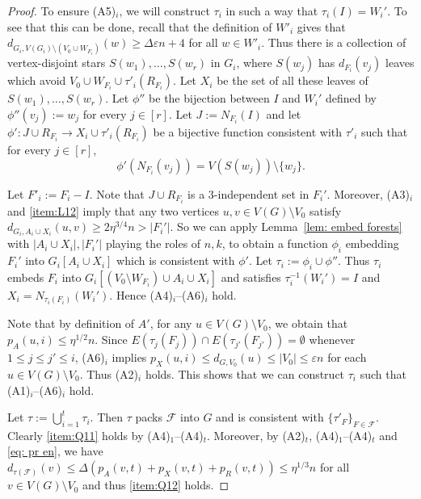 \documentclass[a4paper, 11pt, reqno]{amsart}
\numberwithin{equation}{section}
\newcommand{\1}{{\rm 1\hspace*{-0.4ex}%
\rule{0.1ex}{1.52ex}\hspace*{0.2ex}}}
\newcommand{\cF}{\mathcal{F}}
\renewcommand{\epsilon}{\varepsilon}
\newcommand{\sm}{\setminus}
\begin{document}
\begin{proof}
To ensure (A5)$_i$, we will construct $\tau_i$ in such a way that $\tau_i(I)=W_i'$.
To see that this can be done, recall that the definition of $W'_i$ gives that $d_{G_i,V(G_i)\setminus(V_0\cup W_{F_i})}(w)\geq \Delta \epsilon n+4$ for all $w\in W'_i$. 
Thus there is a collection of vertex-disjoint stars $S(w_1),\ldots,S(w_r)$ in $G_i$, 
where $S(w_j)$ has $d_{F_i}(v_j)$ leaves which avoid $V_0 \cup W_{F_i}\cup \tau'_{i}(R_{F_i})$.
Let $X_i$ be the set of all these leaves of $S(w_1),\ldots,S(w_r)$. 
Let $\phi''$ be the bijection between $I$ and $W_i'$ defined by $\phi''(v_j):=w_j$ for every $j\in [r]$. 
Let $J := N_{F_i}(I)$ and let $\phi': J\cup R_{F_i} \to X_i \cup \tau'_{i}(R_{F_i})$ be a bijective function consistent with $\tau'_{i}$ such that for every $j\in[r]$,
$$\phi'(N_{F_i}(v_j)) = V(S(w_j))\setminus \{w_j\}.$$ 

Let $F'_i:= F_i- I$. 
Note that $J\cup R_{F_i}$ is a $3$-independent set in $F_i'$. %
Moreover, (A3)$_i$ and \ref{item:L12} imply that any two vertices $u,v \in V(G)\sm V_0$ satisfy 
$d_{G_i,A_i\cup X_i}(u,v) \geq 2\eta^{3/4}n > |F_i'|$. 
So we can apply Lemma~\ref{lem: embed forests} with $|A_i\cup X_i|, |F_i'|$ playing the roles of $n, k$,
to obtain a function $\phi_i$ embedding $F_i'$ into $G_i[A_i\cup X_i]$ which is consistent with $\phi'$. 
Let $\tau_{i}:= \phi_i\cup \phi''$.
Thus $\tau_{i}$ embeds $F_i$ into $G_i[(V_0 \sm W_{F_i}) \cup A_i \cup X_i ]$ and satisfies $\tau_i^{-1}(W_i')=I$ and $X_i=N_{\tau_i(F_i)}(W_i')$. 
Hence (A4)$_i$--(A6)$_i$ hold.

Note that by definition of $A'$, for any $u\in V(G)\setminus V_0$, 
we obtain that $p_{A}(u,i)\leq%
\eta^{1/2} n$. 
Since $E(\tau_{j}(F_j))\cap E(\tau_{j'}(F_{j'})) = \emptyset$ whenever $1\leq j \leq j'\leq i$, 
(A6)$_i$ implies
$p_X(u,i)\leq d_{G,V_0}(u)\leq |V_0|\leq \epsilon n$ for each $u\in V(G)\sm V_0$. Thus (A2)$_i$ holds.
This shows that we can construct $\tau_i$ such that (A1)$_i$--(A6)$_i$ hold.


\medskip
Let $\tau := \bigcup_{i=1}^{t} \tau_{i}$. 
Then $\tau$ packs $\cF$ into $G$ and is consistent with $\{\tau'_F\}_{F\in \cF}$.
Clearly \ref{item:Q11} holds by (A4)$_1$--(A4)$_t$.
Moreover, by (A2)$_{t}$, (A4)$_1$--(A4)$_t$ and \eqref{eq: pr en}, 
we have $d_{\tau(\cF)}(v) \leq \Delta (p_A(v,t) +  p_X(v,t)+ p_R(v,t)) \leq \eta^{1/3}n$ for all $v\in V(G)\setminus V_0$
and
thus \ref{item:Q12} holds.


\end{proof}
\end{document}
